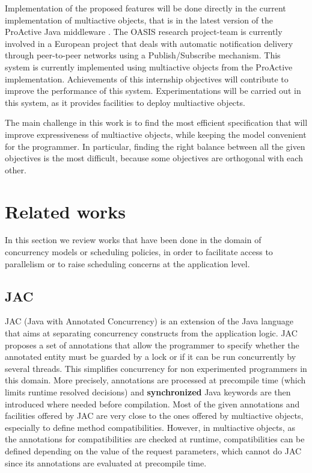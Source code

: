 \documentclass[11pt]{report}
\begin{document}
Implementation of the proposed features will be done directly in the current implementation of multiactive objects, that is in the latest version of the ProActive Java middleware \cite{ref:proactive}.
The OASIS research project-team is currently involved in a European project \cite{ref:play} that deals with automatic notification delivery through peer-to-peer networks using a Publish/Subscribe mechanism. This system is currently implemented using multiactive objects from the ProActive implementation. Achievements of this internship objectives will contribute to improve the performance of this system. Experimentations will be carried out in this system, as it provides facilities to deploy multiactive objects.  

The main challenge in this work is to find the most efficient specification that will improve expressiveness of multiactive objects, while keeping the model convenient for the programmer. In particular, finding the right balance between all the given objectives is the most difficult, because some objectives are orthogonal with each other.

\section{Related works}
In this section we review works that have been done in the domain of concurrency models or scheduling policies, in order to facilitate access to parallelism or to raise scheduling concerns at the application level.
\subsection{JAC}
JAC (Java with Annotated Concurrency) \cite{ref:jac} is an extension of the Java language that aims at separating concurrency constructs from the application logic. JAC proposes a set of annotations that allow the programmer to specify whether the annotated entity must be guarded by a lock or if it can be run concurrently by several threads. This simplifies concurrency for non experimented programmers in this domain. More precisely, annotations are processed at precompile time (which limits runtime resolved decisions) and \textbf{synchronized} Java keywords are then introduced where needed before compilation. Most of the given annotations and facilities offered by JAC are very close to the ones offered by multiactive objects, especially to define method compatibilities. However, in multiactive objects, as the annotations for compatibilities are checked at runtime, compatibilities can be defined depending on the value of the request parameters, which cannot do JAC since its annotations are evaluated at precompile time.
\end{document}
